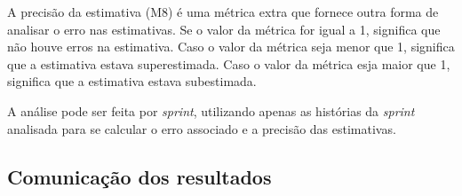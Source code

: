  			A precisão da estimativa (M8) é uma métrica extra que fornece outra forma de analisar o erro nas estimativas. Se o valor da métrica
  			for igual a 1, significa que não houve erros na estimativa. Caso o valor da métrica seja menor que 1, significa que a estimativa estava
  			superestimada. Caso o valor da métrica esja maior que 1, significa que a estimativa estava subestimada.

  			A análise pode ser feita por \textit{sprint}, utilizando apenas as histórias da \textit{sprint} analisada para se calcular o erro associado e a precisão das estimativas.
      
      \subsection{Comunicação dos resultados}